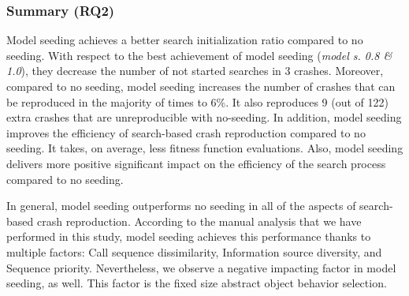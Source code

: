 \subsubsection{Summary (\textbf{RQ2})}


Model seeding achieves a better search initialization ratio compared to no seeding. With respect to the best achievement of model seeding (\textit{model s. 0.8 \& 1.0}), they decrease the number of not started searches in 3 crashes.
%
Moreover, compared to no seeding, model seeding increases the number of crashes that can be reproduced in the majority of times to 6\%. It also reproduces 9 (out of 122) extra crashes that are unreproducible with no-seeding. 
%
In addition, model seeding improves the efficiency of search-based crash reproduction compared to no seeding. It takes, on average, less fitness function evaluations. Also, model seeding delivers more positive significant impact on the efficiency of the search process compared to no seeding.
%

In general, model seeding outperforms no seeding in all of the aspects of search-based crash reproduction. According to the manual analysis that we have performed in this study, model seeding achieves this performance thanks to multiple factors: Call sequence dissimilarity, Information source diversity, and Sequence priority. Nevertheless, we observe a negative impacting factor in model seeding, as well. This factor is the fixed size abstract object behavior selection.

